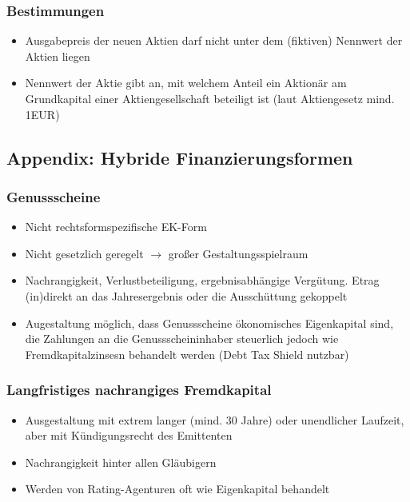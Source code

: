 \subsubsection{Bestimmungen}
\begin{itemize}
	\item Ausgabepreis der neuen Aktien darf nicht unter dem (fiktiven) Nennwert der Aktien liegen
	\item Nennwert der Aktie gibt an, mit welchem Anteil ein Aktionär am Grundkapital einer Aktiengesellschaft beteiligt ist (laut Aktiengesetz mind. 1EUR)
\end{itemize}


\subsection{Appendix: Hybride Finanzierungsformen}

\subsubsection{Genussscheine}
\begin{itemize}
	\item Nicht rechtsformspezifische EK-Form
	\item Nicht gesetzlich geregelt $\rightarrow$ großer Gestaltungsspielraum
	\item Nachrangigkeit, Verlustbeteiligung, ergebnisabhängige Vergütung. Etrag (in)direkt an das Jahresergebnis oder die Ausschüttung gekoppelt
	\item Augestaltung möglich, dass Genussscheine ökonomisches Eigenkapital sind, die Zahlungen an die Genussscheininhaber steuerlich jedoch wie Fremdkapitalzinsesn behandelt werden (Debt Tax Shield nutzbar)
\end{itemize}

\subsubsection{Langfristiges nachrangiges Fremdkapital}
\begin{itemize}
	\item Ausgestaltung mit extrem langer (mind. 30 Jahre) oder unendlicher Laufzeit, aber mit Kündigungsrecht des Emittenten
	\item Nachrangigkeit hinter allen Gläubigern
	\item Werden von Rating-Agenturen oft wie Eigenkapital behandelt
\end{itemize}

